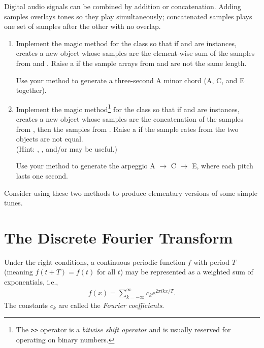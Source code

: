 \begin{problem} %
Digital audio signals can be combined by addition or concatenation.
Adding samples overlays tones so they play simultaneously; concatenated samples plays one set of samples after the other with no overlap.

\begin{enumerate}
\item Implement the  magic method for the  class so that if  and  are  instances,  creates a new  object whose samples are the element-wise sum of the samples from  and .
Raise a  if the sample arrays from  and  are not the same length.

Use your method to generate a three-second A minor chord (A, C, and E together).

\item Implement the  magic method\footnote{The \lstinline[basicstyle=\footnotesize\ttfamily]{>>} operator is a \emph{bitwise shift operator} and is usually reserved for operating on binary numbers.} for the  class so that if  and  are  instances,  creates a new  object whose samples are the concatenation of the samples from , then the samples from .
Raise a  if the sample rates from the two objects are not equal.
\\(Hint: , , and/or  may be useful.)

Use your method to generate the arpeggio A $\rightarrow$ C $\rightarrow$ E, where each pitch lasts one second.

\end{enumerate}
Consider using these two methods to produce elementary versions of some simple tunes.
\label{prob:minor_chord_example}
\end{problem}

\section*{The Discrete Fourier Transform} %

Under the right conditions, a continuous periodic function $f$ with period $T$ (meaning $f(t + T) = f(t)$ for all $t$) may be represented as a weighted sum of exponentials, i.e.,
\begin{align*}
f(x) = \sum_{k=-\infty}^{\infty} c_k e^{2\pi i k x / T}.
\end{align*}
The constants $c_k$ are called the \emph{Fourier coefficients}. %

